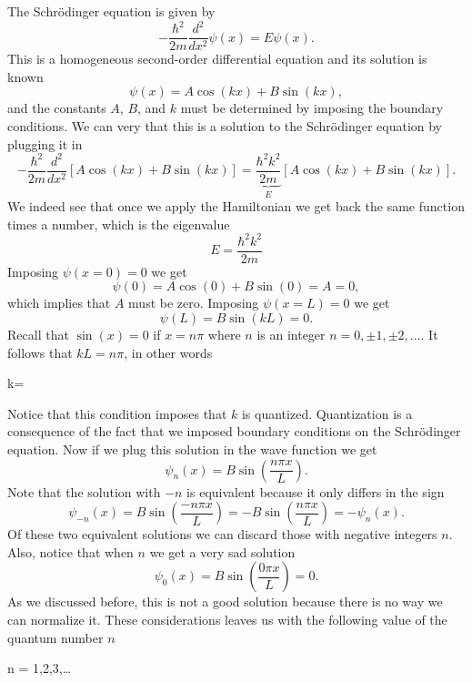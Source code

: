 \documentclass[../Main/chem331-notes.tex]{subfiles}
\begin{document}
The Schr\"{o}dinger equation is given by
\begin{equation}
-\frac{\hbar^2}{2m} \frac{d^2}{dx^2} \psi(x) = E \psi(x).
\end{equation}
This is a homogeneous second-order differential equation and its solution is known
\begin{equation}
\psi(x) = A \cos(kx) + B \sin(kx),
\end{equation}
and the constants $A$, $B$, and $k$ must be determined by imposing the boundary conditions.
We can very that this is a solution to the Schr\"{o}dinger equation  by plugging it in
\begin{equation}
-\frac{\hbar^2}{2m} \frac{d^2}{dx^2} \left[ A \cos(kx) + B \sin(kx) \right]
= \underbrace{\frac{\hbar^2 k^2}{2m}}_{E} \left[ A \cos(kx) + B \sin(kx) \right].
\end{equation}
We indeed see that once we apply the Hamiltonian we get back the same function times a number, which is the eigenvalue
\begin{equation}
E = \frac{\hbar^2 k^2}{2m}
\end{equation}
Imposing $\psi(x = 0) = 0$ we get
\begin{equation}
\psi(0) = A \cos(0) + B \sin(0) = A = 0,
\end{equation}
which implies that $A$ must be zero.
Imposing $\psi(x = L) = 0$ we get
\begin{equation}
\psi(L) = B \sin(k L) = 0.
\end{equation}
Recall that $\sin(x) = 0$ if $x = n \pi$ where $n$ is an integer $n= 0, \pm 1, \pm 2, \ldots$.
It follows that $k L = n \pi$, in other words
\begin{iequation}
k=
\end{iequation}
Notice that this condition imposes that $k$ is quantized.
Quantization is a consequence of the fact that we imposed boundary conditions on the Schr\"{o}dinger equation.
Now if we plug this solution in the wave function we get
\begin{equation}
\psi_{n}(x) = B \sin\left(\frac{n \pi x}{L}\right).
\end{equation}
Note that the solution with $-n$ is equivalent because it only differs in the sign
\begin{equation}
\psi_{-n}(x) = B \sin\left(\frac{-n \pi x}{L}\right) = - B \sin\left(\frac{n \pi x}{L}\right) = -\psi_{n}(x).
\end{equation}
Of these two equivalent solutions we can discard those with negative integers $n$.
Also, notice that when $n$ we get a very sad solution
\begin{equation}
\psi_{0}(x) = B \sin\left(\frac{0 \pi x}{L}\right)  = 0.
\end{equation}
As we discussed before, this is not a good solution because there is no way we can normalize it.
These considerations leaves us with the following value of the quantum number $n$
\begin{iequation}
n = 1,2,3,\ldots
\end{iequation}
\end{document}
